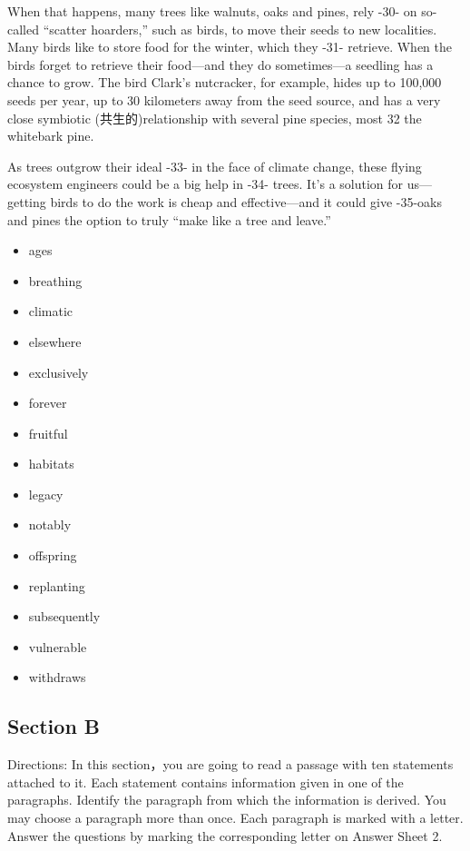 \documentclass[UTF8,11pt]{ctexart}
\begin{document}
When that happens, many trees like walnuts, oaks and pines, rely -30- on so-called “scatter hoarders,” such as birds, to move their seeds to new localities. Many birds like to store food for the winter, which they -31- retrieve. When the birds forget to retrieve their food---and they do sometimes—a seedling has a chance to grow. The bird Clark’s nutcracker, for example, hides up to 100,000 seeds per year, up to 30 kilometers away from the seed source, and has a very close symbiotic (共生的)relationship with several pine species, most 32 the whitebark pine.


As trees outgrow their ideal -33- in the face of climate change, these flying ecosystem engineers could be a big help in -34- trees. It’s a solution for us—getting birds to do the work is cheap and effective—and it could give -35-oaks and pines the option to truly “make like a tree and leave.”


\begin{itemize}[leftmargin=2em,itemsep=.2em,topsep=.4em]\item[A.] ages
\item[B.] breathing
\item[C.] climatic
\item[D.] elsewhere
\item[E.] exclusively
\item[F.] forever
\item[G.] fruitful
\item[H.] habitats
\item[I.] legacy
\item[J.] notably
\item[K.] offspring
\item[L.] replanting
\item[M.] subsequently
\item[N.] vulnerable
\item[O.] withdraws
\end{itemize}

\subsection*{\textbf{Section B}}


Directions: In this section，you are going to read a passage with ten statements attached to it. Each statement contains information given in one of the paragraphs. Identify the paragraph from which the information is derived. You may choose a paragraph more than once. Each paragraph is marked with a letter. Answer the questions by marking the corresponding letter on Answer Sheet 2.
\end{document}
